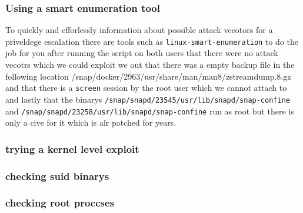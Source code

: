 \documentclass[a4paper]{article}
\begin{document}
\subsubsection{Using a smart enumeration tool}
To quickly and efforlessly information about possible attack vecotors for a priveldege escalation there are tools such as \texttt{linux-smart-enumeration} to do the job for you after running the script on both users that there were no attack vecotrs which we could exploit we out that there was a empty backup file in the following location {/snap/docker/2963/usr/share/man/man8/zstreamdump.8.gz} and that there is a \texttt{screen} session by the root user which we cannot attach to  and lastly that the binarys \texttt{/snap/snapd/23545/usr/lib/snapd/snap-confine} and \texttt{/snap/snapd/23258/usr/lib/snapd/snap-confine} run as root but there is only a cive for it which is alr patched for years.
\subsubsection{trying a kernel level exploit}
\subsubsection{checking suid binarys}
\subsubsection{checking root proccses}
\end{document}
